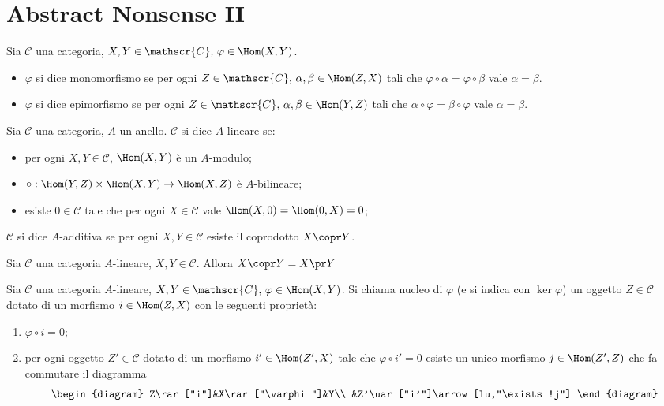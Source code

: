 \section{Abstract Nonsense II}
\begin{definition}
Sia $\mathscr{C}$ una categoria, $X,Y\in\mathscr{C}\comma\varphi\in\Hom(X,Y)$.
\begin{itemize}
\item $\varphi$ si dice monomorfismo se per ogni $Z\in\mathscr{C}\comma\alpha,\beta\in\Hom(Z,X)$ tali che $\varphi\circ\alpha=\varphi\circ\beta$ vale $\alpha=\beta$.
\item $\varphi$ si dice epimorfismo se per ogni $Z\in\mathscr{C}\comma\alpha,\beta\in\Hom(Y,Z)$ tali che $\alpha\circ\varphi=\beta\circ\varphi$ vale $\alpha=\beta$.
\end{itemize}
\end{definition}
\begin{definition}
Sia $\mathscr{C}$ una categoria, $A$ un anello. $\mathscr{C}$ si dice $A$-lineare se:
\begin{itemize}
\item per ogni $X,Y\in\mathscr{C}$, $\Hom(X,Y)$ è un $A$-modulo;
\item $\map{\circ}{\Hom(Y,Z)\times\Hom(X,Y)}{\Hom(X,Z)}$ è $A$-bilineare;
\item esiste $0\in\mathscr{C}$ tale che per ogni $X\in\mathscr{C}$ vale $\Hom(X,0)=\Hom(0,X)=0$;
\end{itemize}
$\mathscr{C}$ si dice $A$-additiva se per ogni $X,Y\in\mathscr{C}$ esiste il coprodotto $X\copr Y$.
\end{definition}
\begin{proposition}
Sia $\mathscr{C}$ una categoria $A$-lineare, $X,Y\in\mathscr{C}$. Allora $X\copr Y=X\pr Y$
\end{proposition}
\begin{definition}
Sia $\mathscr{C}$ una categoria $A$-lineare, $X,Y\in\mathscr{C}\comma\varphi\in\Hom(X,Y)$. Si chiama nucleo di $\varphi$ (e si indica con $\ker\varphi$) un oggetto $Z\in\mathscr{C}$ dotato di un morfismo $i\in\Hom(Z,X)$ con le seguenti proprietà:
\begin{enumerate}
\item $\varphi\circ i=0$;
\item per ogni oggetto $Z'\in\mathscr{C}$ dotato di un morfismo $i'\in\Hom(Z',X)$ tale che $\varphi\circ i'=0$ esiste un unico morfismo $j\in\Hom(Z',Z)$ che fa commutare il diagramma
$$
\begin{diagram}
Z\rar["i"]&X\rar["\varphi"]&Y\\
&Z'\uar["i'"]\arrow[lu,"\exists!j"]
\end{diagram}
$$
\end{enumerate}
\end{definition}
